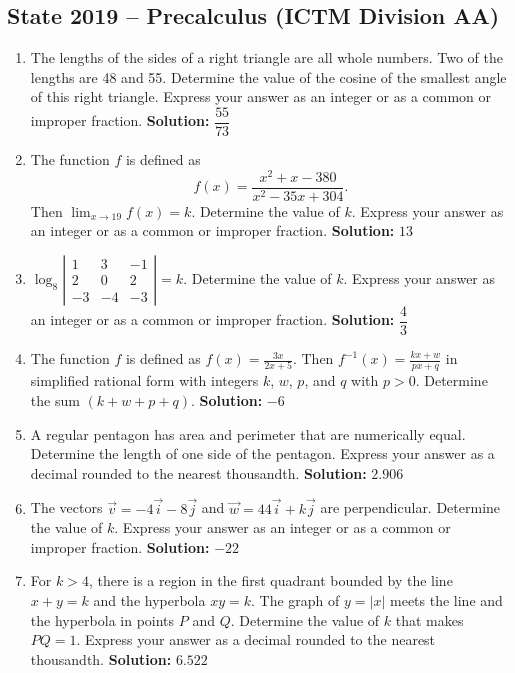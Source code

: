 \documentclass[10pt]{article}
\begin{document}
\subsection*{State 2019 -- Precalculus (ICTM Division AA)}
\begin{enumerate}
\item The lengths of the sides of a right triangle are all whole numbers. Two of the lengths are 48 and 55. Determine the value of the cosine of the smallest angle of this right triangle. Express your answer as an integer or as a common or improper fraction. \textbf{Solution:} $\boxed{\dfrac{55}{73}}$

\item The function $f$ is defined as
\[
f(x)=\frac{x^2+x-380}{x^2-35x+304}.
\]
Then $\displaystyle\lim_{x\to19} f(x)=k$. Determine the value of $k$. Express your answer as an integer or as a common or improper fraction. \textbf{Solution:} $\boxed{13}$

\item $\displaystyle\log_8\left|\begin{matrix}1&3&-1\\2&0&2\\-3&-4&-3\end{matrix}\right|=k$. Determine the value of $k$. Express your answer as an integer or as a common or improper fraction. \textbf{Solution:} $\boxed{\dfrac{4}{3}}$

\item The function $f$ is defined as $\displaystyle f(x)=\frac{3x}{2x+5}$. Then $\displaystyle f^{-1}(x)=\frac{kx+w}{px+q}$ in simplified rational form with integers $k$, $w$, $p$, and $q$ with $p>0$. Determine the sum $(k+w+p+q)$. \textbf{Solution:} $\boxed{-6}$

\item A regular pentagon has area and perimeter that are numerically equal. Determine the length of one side of the pentagon. Express your answer as a decimal rounded to the nearest thousandth. \textbf{Solution:} $\boxed{2.906}$

\item The vectors $\vec{v}=-4\vec{i}-8\vec{j}$ and $\vec{w}=44\vec{i}+k\vec{j}$ are perpendicular. Determine the value of $k$. Express your answer as an integer or as a common or improper fraction. \textbf{Solution:} $\boxed{-22}$

\item For $k>4$, there is a region in the first quadrant bounded by the line $x+y=k$ and the hyperbola $xy=k$. The graph of $y=|x|$ meets the line and the hyperbola in points $P$ and $Q$. Determine the value of $k$ that makes $PQ=1$. Express your answer as a decimal rounded to the nearest thousandth. \textbf{Solution:} $\boxed{6.522}$


\end{enumerate}
\end{document}
